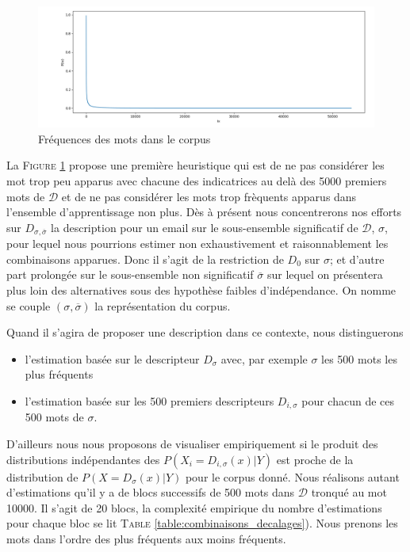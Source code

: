 \documentclass[a4paper, french]{article}
\begin{document}
\begin{figure}[h]
\begin{center}
    \caption{Fr\'equences des mots dans le corpus}
    \includegraphics[width=13cm]{repr0}
\end{center}
\label{fig:repr0}
\end{figure}

La F\textsc{igure} \ref{fig:repr0} propose une premi\`ere heuristique qui est
de ne pas consid\'erer les mot trop peu apparus avec chacune des indicatrices
au del\`a des 5000 premiers mots de $\mathcal{D}$ et de ne pas consid\'erer
les mots trop fr\`equents  apparus dans l'ensemble d'apprentissage non plus.
D\`es \`a pr\'esent nous concentrerons nos efforts sur $D_{\sigma,\overline\sigma}$
la description pour un email sur le sous-ensemble significatif de
$\mathcal{D}$, $\sigma$, pour lequel nous pourrions estimer non exhaustivement
et raisonnablement les combinaisons apparues. Donc il s'agit de la restriction de
$D_0$ sur $\sigma$; et d'autre part prolong\'ee sur le sous-ensemble
non significatif $\overline\sigma$ sur lequel on pr\'esentera plus loin
des alternatives sous des hypoth\`ese faibles d'ind\'ependance.
On nomme se couple $(\sigma, \overline\sigma)$ la repr\'esentation du corpus.

Quand il s'agira de proposer une description dans ce contexte, nous distinguerons
\begin{itemize}
    \item l'estimation bas\'ee sur le descripteur $D_\sigma$ avec, par exemple
        $\sigma$ les 500 mots les plus fr\'equents
    \item l'estimation bas\'ee sur les 500 premiers descripteurs $D_{i,\sigma}$
        pour chacun de ces 500 mots de $\sigma$.
\end{itemize}


\vskip 4mm
D'ailleurs nous nous proposons de visualiser empiriquement si le produit des
distributions ind\'ependantes des $P(X_i=D_{i,\sigma}(x)|Y)$  est proche de la distribution
de $P(X=D_{\sigma}(x)|Y)$ pour le corpus donn\'e. Nous r\'ealisons autant d'estimations
qu'il y a de blocs successifs de 500 mots dans $\mathcal{D}$ tronqu\'e au mot 10000.
%
Il s'agit de 20 blocs, la complexit\'e empirique du nombre d'estimations
pour chaque bloc se lit T\textsc{able} \ref{table:combinaisons_decalages}).
%
Nous prenons les mots dans l'ordre des plus fr\'equents aux moins fr\'equents.
\end{document}
